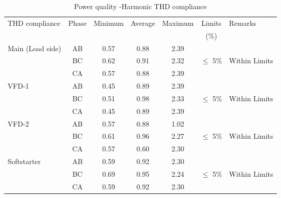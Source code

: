 \begin{table}[!htb]
	\caption{Power quality -Harmonic THD compliance}
	\label{tbl_ch04_elecaudit_powerquality_thdcompliance}
	{\scriptsize
		
		\begin{tabular}{l|c|c|c|c|c|l}
\hline
THD compliance & Phase & Minimum & Average & Maximum & Limits & Remarks \\ 
&  &  &  &  & (\%) &  \\ 
\hline
Main (Load side) & AB & 0.57 & 0.88 & 2.39 &  &  \\ 
& BC & 0.62 & 0.91 & 2.32 & $\leq$ 5\% & Within  Limits \\ 
& CA & 0.57 & 0.88 & 2.39 &  &  \\ 
\hline
VFD-1 & AB & 0.45 & 0.89 & 2.39 &  &  \\ 
& BC & 0.51 & 0.98 & 2.33 & $\leq$ 5\% & Within Limits \\ 
& CA & 0.45 & 0.89 & 2.39 &  &  \\ 
\hline
VFD-2 & AB & 0.57 & 0.88 & 1.02 &  &  \\ 
& BC & 0.61 & 0.96 & 2.27 & $\leq$ 5\% & Within Limits \\ 
& CA & 0.57 & 0.60 & 2.30 &  &  \\ 
\hline
Softstarter & AB & 0.59 & 0.92 & 2.30 &  &  \\ 
& BC & 0.69 & 0.95 & 2.24 & $\leq$ 5\% & Within Limits \\ 
& CA & 0.59 & 0.92 & 2.30 &  &  \\ 
\hline
		\end{tabular}
		
		
		
	}%
\end{table}